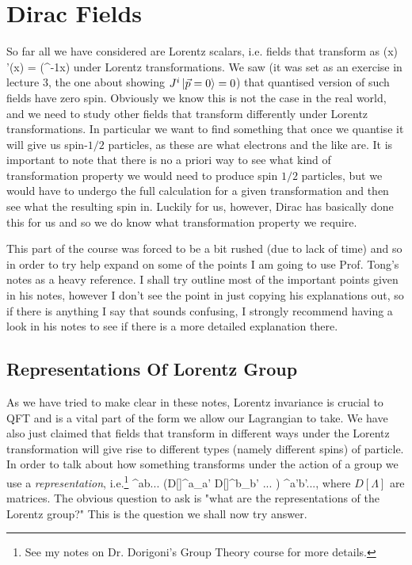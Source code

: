 \chapter{Dirac Fields}

So far all we have considered are Lorentz scalars, i.e. fields that transform as
\bse 
    \phi(x) \to \phi'(x) = \phi\big(\Lambda^{-1}x\big)
\ese
under Lorentz transformations. We saw (it was set as an exercise in lecture 3, the one about showing $J^i\ket{\Vec{p}=0}=0$) that quantised version of such fields have zero spin. Obviously we know this is not the case in the real world, and we need to study other fields that transform differently under Lorentz transformations. In particular we want to find something that once we quantise it will give us spin-$1/2$ particles, as these are what electrons and the like are. It is important to note that there is no a priori way to see what kind of transformation property we would need to produce spin $1/2$ particles, but we would have to undergo the full calculation for a given transformation and then see what the resulting spin in. Luckily for us, however, Dirac has basically done this for us and so we do know what transformation property we require. 

\br 
    This part of the course was forced to be a bit rushed (due to lack of time) and so in order to try help expand on some of the points I am going to use Prof. Tong's notes as a heavy reference. I shall try outline most of the important points given in his notes, however I don't see the point in just copying his explanations out, so if there is anything I say that sounds confusing, I strongly recommend having a look in his notes to see if there is a more detailed explanation there. 
\er 

\section{Representations Of Lorentz Group}

As we have tried to make clear in these notes, Lorentz invariance is crucial to QFT and is a vital part of the form we allow our Lagrangian to take. We have also just claimed that fields that transform in different ways under the Lorentz transformation will give rise to different types (namely different spins) of particle. In order to talk about how something transforms under the action of a group we use a \textit{representation}, i.e.\footnote{See my notes on Dr. Dorigoni's Group Theory course for more details.}
\bse 
    \phi^{ab...} \to \Big({D[\Lambda]^a}_{a'} {D[\Lambda]^b}_{b'} ... \Big) \phi^{a'b'...},
\ese 
where $D[\Lambda]$ are matrices. The obvious question to ask is "what are the representations of the Lorentz group?" This is the question we shall now try answer. 

